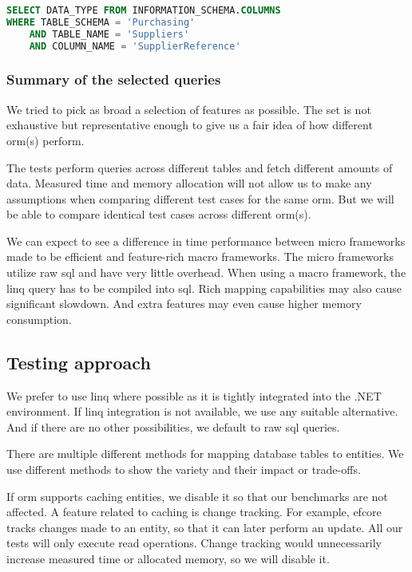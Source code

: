 \begin{lstlisting}[language=SQL]
SELECT DATA_TYPE FROM INFORMATION_SCHEMA.COLUMNS 
WHERE TABLE_SCHEMA = 'Purchasing'
    AND TABLE_NAME = 'Suppliers'
    AND COLUMN_NAME = 'SupplierReference'
\end{lstlisting}

\subsubsection{Summary of the selected queries}
We tried to pick as broad a selection of features as possible. 
The set is not exhaustive but representative enough to give us a fair idea of how different \acrshort{orm}(s) perform. 

The tests perform queries across different tables and fetch different amounts of data. 
Measured time and memory allocation will not allow us to make any assumptions when comparing different test cases for the same \acrshort{orm}.
But we will be able to compare identical test cases across different \acrshort{orm}(s).

We can expect to see a difference in time performance between micro frameworks made to be efficient and feature-rich macro frameworks.
The micro frameworks utilize raw \acrshort{sql} and have very little overhead. When using a macro framework, the \acrshort{linq} query has to be compiled into \acrshort{sql}. Rich mapping capabilities may also cause significant slowdown. And extra features may even cause higher memory consumption.

\subsection{Testing approach}
\label{sec:testing_approach}
We prefer to use \acrshort{linq} where possible as it is tightly integrated into the .NET environment. 
If \acrshort{linq} integration is not available, we use any suitable alternative. And if there are no other possibilities, we default to raw \acrshort{sql} queries. 

There are multiple different methods for mapping database tables to entities. We use different methods to show the variety and their impact or trade-offs. 

If \acrshort{orm} supports caching entities, we disable it so that our benchmarks are not affected. 
A feature related to caching is change tracking. For example, \acrshort{efcore} tracks changes made to an entity, so that it can later perform an update. All our tests will only execute read operations. Change tracking would unnecessarily increase measured time or allocated memory, so we will disable it.

